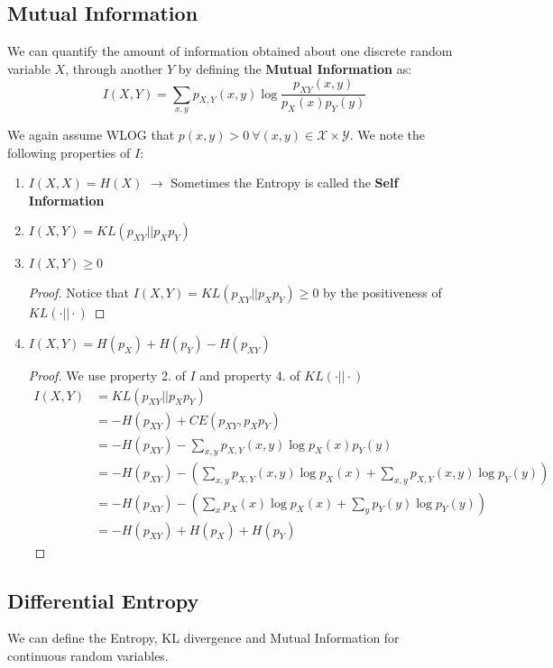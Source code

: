 \documentclass[]{article}
\theoremstyle{mattstyle}
\theoremstyle{definition}
\begin{document}
\subsection{Mutual Information}
We can quantify the amount of information obtained about one discrete random variable $X$, through another $Y$ by defining the \textbf{Mutual Information} as:
\begin{equation}
I(X,Y)=\sum_{x,y}p_{X,Y}(x,y)\log\frac{p_{XY}(x,y)}{p_X(x)p_Y(y)}
\end{equation}

We again assume WLOG that \(p(x,y)>0 \ \forall (x,y)\in\mathcal{X}\times\mathcal{Y}\). We note the following properties of $I$:

\begin{enumerate}
	\item \(I(X,X) = H(X)\) \(\rightarrow\) Sometimes the Entropy is called the \textbf{Self Information}
	\item $I(X,Y) = KL(p_{XY}||p_Xp_Y)$
	\item \(I(X,Y)\ge 0\)
	\begin{proof}
		Notice that \(I(X,Y) = KL(p_{XY}||p_Xp_Y) \ge 0\) by the positiveness of \(KL(\cdot||\cdot)\)
	\end{proof}
	\item $I(X,Y) = H(p_X) + H(p_Y) -H(p_{XY})$
	\begin{proof} We use property 2. of $I$ and property 4. of \(KL(\cdot||\cdot)\)
		\begin{align*}
		I(X,Y) &= KL(p_{XY}||p_Xp_Y) \\
		&= -H(p_{XY}) + CE(p_{XY},p_Xp_Y) \\
		&= -H(p_{XY}) - \sum_{x,y}p_{X,Y}(x,y)\log p_X(x)p_Y(y)\\
		&= -H(p_{XY}) - \left(\sum_{x,y}p_{X,Y}(x,y)\log p_X(x) + \sum_{x,y}p_{X,Y}(x,y)\log p_Y(y)\right)\\
		&=-H(p_{XY}) - \left(\sum_{x}p_{X}(x)\log p_X(x) + \sum_{y}p_{Y}(y)\log p_Y(y)\right)\\
		&= -H(p_{XY}) + H(p_X) + H(p_Y)
		\end{align*}
	\end{proof}
	
\end{enumerate}

\subsection{Differential Entropy}
We can define the Entropy, KL divergence and Mutual Information for continuous random variables.
\end{document}
